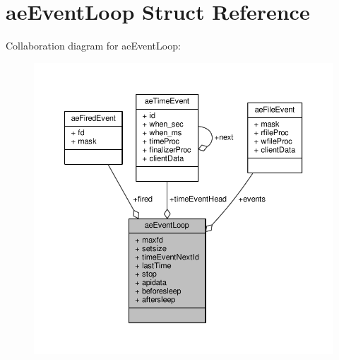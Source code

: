 \hypertarget{structaeEventLoop}{}\section{ae\+Event\+Loop Struct Reference}
\label{structaeEventLoop}


Collaboration diagram for ae\+Event\+Loop\+:\nopagebreak
\begin{figure}[H]
\begin{center}
\leavevmode
\includegraphics[width=350pt]{structaeEventLoop__coll__graph}
\end{center}
\end{figure}
